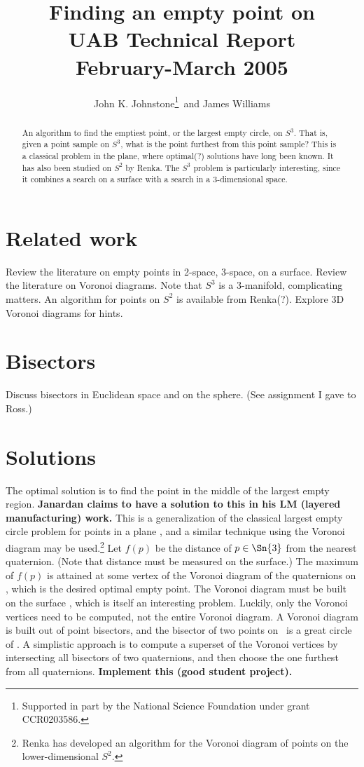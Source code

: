 \documentclass[12pt]{article}
\title{Finding an empty point on \Sn{3}\\[5pt]{\small UAB Technical Report\\
       February-March 2005}}
\author{John K. Johnstone\thanks{Supported in part by the National Science Foundation
        under grant CCR0203586.}\ and James Williams}
\begin{document}
\maketitle

\begin{abstract}
An algorithm to find the emptiest point, or the largest empty circle, on $S^3$.
That is, given a point sample on $S^3$, what is the point furthest from this point
sample?  This is a classical problem in the plane, where optimal(?) 
solutions have long been known.  It has also been studied on $S^2$ by Renka.
The $S^3$ problem is particularly interesting, since it combines a search on
a surface with a search in a 3-dimensional space.
\end{abstract}

\section{Related work}

Review the literature on empty points in 2-space, 3-space, on a surface.
Review the literature on Voronoi diagrams.
Note that $S^3$ is a 3-manifold, complicating matters.
An algorithm for points on $S^2$ is available from 
Renka(?).  
Explore 3D Voronoi diagrams for hints.

\section{Bisectors}

Discuss bisectors in Euclidean space and on the sphere. (See assignment I gave
to Ross.)

\section{Solutions}

The optimal solution is to find
the point in the middle of the largest empty region.
{\bf Janardan claims to have a solution to this in his LM (layered manufacturing) work.}
This is a generalization of the classical largest empty circle
problem for points in a plane \cite{shamos85}, 
and a similar technique using the Voronoi diagram may be used.\footnote{Renka \cite{renka}
  has developed an algorithm for the Voronoi diagram of points on the lower-dimensional
  $S^2$.}
Let $f(p)$ be the distance of $p \in \Sn{3}$ from the nearest quaternion.
(Note that distance must be measured on the surface.)
The maximum of $f(p)$ 
is attained at some vertex of the Voronoi diagram of the quaternions on ,
which is the desired optimal empty point.
The Voronoi diagram must be built on the surface , which 
is itself an interesting problem.
Luckily, only the Voronoi vertices need to be computed,
not the entire Voronoi diagram.
A Voronoi diagram is built out of point bisectors, and
the bisector of two points on \ is a great circle of .
A simplistic approach is to compute a superset of the Voronoi vertices
by intersecting all bisectors of two quaternions, and then 
choose the one furthest from all quaternions.
{\bf Implement this (good student project).}
\end{document}
